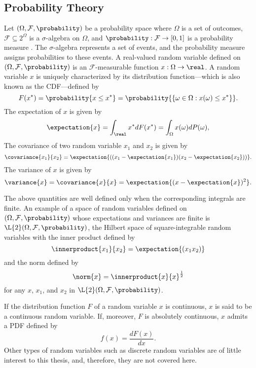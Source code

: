 \subsection{Probability Theory}

Let $(\Omega, \mathcal{F}, \probability)$ be a probability space where $\Omega$
is a set of outcomes, $\mathcal{F} \subseteq 2^\Omega$ is a $\sigma$-algebra on
$\Omega$, and $\probability: \mathcal{F} \to [0, 1]$ is a probability measure
\cite{durrett2010}. The $\sigma$-algebra represents a set of events, and the
probability measure assigns probabilities to these events. A real-valued random
variable defined on $(\Omega, \mathcal{F}, \probability)$ is an
$\mathcal{F}$-measurable function $x: \Omega \to \real$. A random variable $x$
is uniquely characterized by its distribution function---which is also known as
the \ac{CDF}---defined by
\begin{equation*}
  F(x^*) = \probability{x \leq x^*} = \probability{\{ \omega \in \Omega: x(\omega) \leq x^* \}}.
\end{equation*}
The expectation of $x$ is given by
\[
  \expectation{x} = \int_\real x^* dF(x^*) = \int_\Omega x(\omega) dP(\omega),
\]
The covariance of two random variable $x_1$ and $x_2$ is given by
\[
  \covariance{x_1}{x_2} = \expectation{((x_1 - \expectation{x_1})(x_2 - \expectation{x_2}))}.
\]
The variance of $x$ is given by
\[
  \variance{x} = \covariance{x}{x} = \expectation{(x - \expectation{x})^2}.
\]

The above quantities are well defined only when the corresponding integrals are
finite. An example of a space of random variables defined on $(\Omega,
\mathcal{F}, \probability)$ whose expectations and variances are finite is
$\L{2}(\Omega, \mathcal{F}, \probability)$, the Hilbert space of
square-integrable random variables \cite{janson1997} with the inner product
defined by
\[
  \innerproduct{x_1}{x_2} = \expectation{(x_1 x_2)}
\]
and the norm defined by
\[
  \norm{x} = \innerproduct{x}{x}^\frac{1}{2}
\]
for any $x$, $x_1$, and $x_2$ in $\L{2}(\Omega, \mathcal{F}, \probability)$.

If the distribution function $F$ of a random variable $x$ is continuous, $x$ is
said to be a continuous random variable. If, moreover, $F$ is absolutely
continuous, $x$ admits a \ac{PDF} defined by
\[
  f(x) = \frac{dF(x)}{dx}.
\]
Other types of random variables such as discrete random variables are of little
interest to this thesis, and, therefore, they are not covered here.

